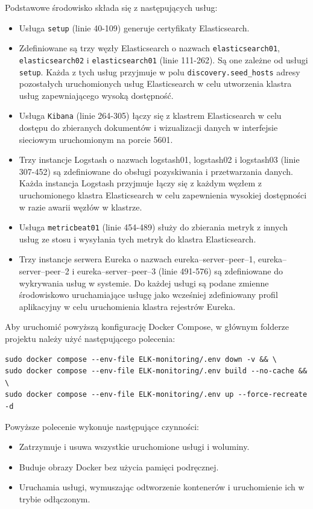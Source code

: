 Podstawowe środowisko składa się z następujących usług:
\begin{itemize}
    \item Usługa \verb|setup| (linie 40-109) generuje certyfikaty Elasticsearch. 
    \item Zdefiniowane są trzy węzły Elasticsearch o nazwach \verb|elasticsearch01|, \verb|elasticsearch02| i \verb|elasticsearch01| (linie 111-262). Są one zależne od usługi \verb|setup|. Każda z tych usług przyjmuje w polu \verb|discovery.seed_hosts| adresy pozostałych uruchomionych usług Elasticsearch w celu utworzenia klastra usług zapewniającego wysoką dostępność.
    \item Usługa \verb|Kibana| (linie 264-305) łączy się z klastrem Elasticsearch w celu dostępu do zbieranych dokumentów i wizualizacji danych w interfejsie sieciowym uruchomionym na porcie 5601.
    \item Trzy instancje Logstash o nazwach logstash01, logstash02 i logstash03 (linie 307-452) są zdefiniowane do obsługi pozyskiwania i przetwarzania danych. Każda instancja Logstash przyjmuje łączy się z każdym węzłem z uruchomionego klastra Elasticsearch w celu zapewnienia wysokiej dostępności w razie awarii węzłów w klastrze.
    \item Usługa \verb|metricbeat01| (linie 454-489) służy do zbierania metryk z innych usług ze stosu  i wysyłania tych metryk do klastra Elasticsearch.
    \item Trzy instancje serwera Eureka o nazwach eureka--server--peer--1, eureka--server--peer--2 i eureka--server--peer--3 (linie 491-576) są zdefiniowane do wykrywania usług w systemie. Do każdej usługi są podane zmienne środowiskowo uruchamiające usługę jako wcześniej zdefiniowany profil aplikacyjny w celu uruchomienia klastra rejestrów Eureka.
\end{itemize}

Aby uruchomić powyższą konfigurację Docker Compose, w głównym folderze projektu należy użyć następującego polecenia:

\begin{verbatim}
sudo docker compose --env-file ELK-monitoring/.env down -v && \
sudo docker compose --env-file ELK-monitoring/.env build --no-cache && \
sudo docker compose --env-file ELK-monitoring/.env up --force-recreate -d
\end{verbatim}

Powyższe polecenie wykonuje następujące czynności:

\begin{itemize}
    \item Zatrzymuje i usuwa wszystkie uruchomione usługi i woluminy.
    \item Buduje obrazy Docker bez użycia pamięci podręcznej.
    \item Uruchamia usługi, wymuszając odtworzenie kontenerów i uruchomienie ich w trybie odłączonym.
\end{itemize}


